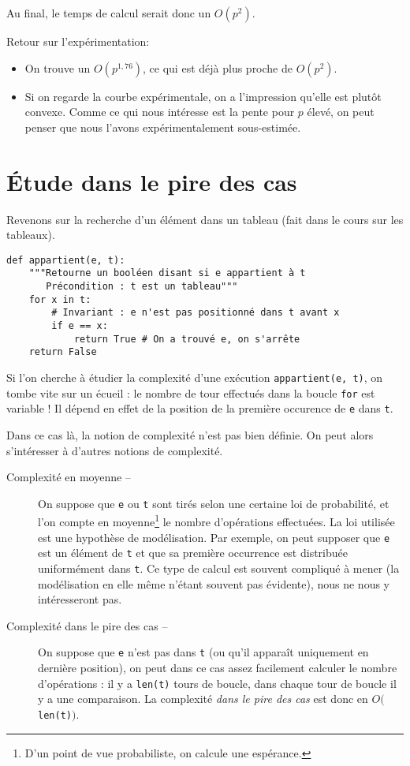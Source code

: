 Au final, le temps de calcul serait donc un $O(p^{2})$.

Retour sur l'expérimentation:
\begin{itemize}
\item[\textbullet] On trouve un $O(p^{1,76})$, ce qui est déjà plus proche de $O(p^{2})$.
\item[\textbullet] Si on regarde la courbe expérimentale, on a l'impression qu'elle
  est plutôt convexe. Comme ce qui nous intéresse est la pente pour
  $p$ élevé, on peut penser que nous l'avons expérimentalement sous-estimée.
\end{itemize}

\section{\'Etude dans le pire des cas}

Revenons sur la recherche d'un élément dans un tableau (fait dans le cours sur les tableaux). 

\begin{lstlisting}
def appartient(e, t):
    """Retourne un booléen disant si e appartient à t
       Précondition : t est un tableau"""
    for x in t:
        # Invariant : e n'est pas positionné dans t avant x
        if e == x:
            return True # On a trouvé e, on s'arrête
    return False
\end{lstlisting}

Si l'on cherche à étudier la complexité d'une exécution \texttt{appartient(e, t)}, on tombe vite sur un écueil : le nombre de tour effectués dans la boucle \texttt{for} est variable ! 
Il dépend en effet de la position de la première occurence de \texttt{e} dans \texttt{t}. 

Dans ce cas là, la notion de complexité n'est pas bien définie. On peut alors s'intéresser à d'autres notions de complexité. 

\begin{description}
  \item[Complexité en moyenne --] On suppose que \texttt{e} ou \texttt{t} sont tirés selon une certaine loi 
de probabilité, et l'on compte \og en moyenne\footnote{D'un point de vue probabiliste, on calcule une 
espérance.} \fg{} le nombre d'opérations effectuées. 
    La loi utilisée est une hypothèse de modélisation. Par exemple, on peut supposer que \texttt{e} est un élément de \texttt{t} et que sa première occurrence est distribuée uniformément dans \texttt{t}. 
    Ce type de calcul est souvent compliqué à mener (la modélisation en elle même n'étant souvent pas évidente), nous ne nous y intéresseront pas. 
  \item[Complexité dans le pire des cas --] On suppose que \texttt{e} n'est pas dans \texttt{t} (ou qu'il apparaît uniquement en dernière position), on peut dans ce cas assez facilement calculer le nombre d'opérations : 
    il y a \texttt{len(t)} tours de boucle, dans chaque tour de boucle il y a une comparaison. La complexité \emph{dans le pire des cas} est donc en $O($\texttt{len(t)}$)$.
\end{description}

